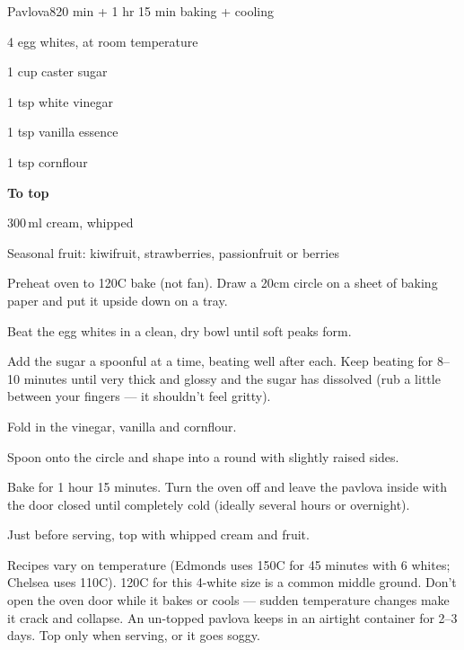 \begin{recipebox}{Pavlova}{8}{20 min + 1 hr 15 min baking + cooling}
\begin{ingredients}
  \item 4 egg whites, at room temperature
  \item 1 cup caster sugar
  \item 1 tsp white vinegar
  \item 1 tsp vanilla essence
  \item 1 tsp cornflour
  \item[] \textbf{To top}
  \item 300\,ml cream, whipped
  \item Seasonal fruit: kiwifruit, strawberries, passionfruit or berries
\end{ingredients}

\begin{method}
  \item Preheat oven to 120\degree C bake (not fan). Draw a 20cm circle on a sheet of baking paper and put it upside down on a tray.
  \item Beat the egg whites in a clean, dry bowl until soft peaks form.
  \item Add the sugar a spoonful at a time, beating well after each. Keep beating for 8--10 minutes until very thick and glossy and the sugar has dissolved (rub a little between your fingers --- it shouldn't feel gritty).
  \item Fold in the vinegar, vanilla and cornflour.
  \item Spoon onto the circle and shape into a round with slightly raised sides.
  \item Bake for 1 hour 15 minutes. Turn the oven off and leave the pavlova inside with the door closed until completely cold (ideally several hours or overnight).
  \item Just before serving, top with whipped cream and fruit.
\end{method}

\begin{notes}
Recipes vary on temperature (Edmonds uses 150\degree C for 45 minutes with 6 whites; Chelsea uses 110\degree C). 120\degree C for this 4-white size is a common middle ground.
Don't open the oven door while it bakes or cools --- sudden temperature changes make it crack and collapse.
An un-topped pavlova keeps in an airtight container for 2--3 days. Top only when serving, or it goes soggy.
\end{notes}
\end{recipebox}
